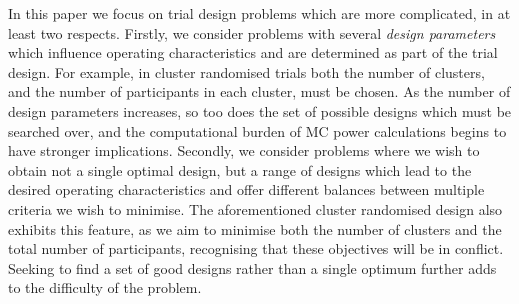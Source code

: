 \documentclass{article} %
\begin{document}
In this paper we focus on trial design problems which are more complicated, in at least two respects. Firstly, we consider problems with several \emph{design parameters} which influence operating characteristics and are determined as part of the trial design. For example, in cluster randomised trials both the number of clusters, and the number of participants in each cluster, must be chosen. As the number of design parameters increases, so too does the set of possible designs which must be searched over, and the computational burden of MC power calculations begins to have stronger implications. Secondly, we consider problems where we wish to obtain not a single optimal design, but a range of designs which lead to the desired operating characteristics and offer different balances between multiple criteria we wish to minimise. The aforementioned cluster randomised design also exhibits this feature, as we aim to minimise both the number of clusters and the total number of participants, recognising that these objectives will be in conflict. Seeking to find a set of good designs rather than a single optimum further adds to the difficulty of the problem.


\end{document}
